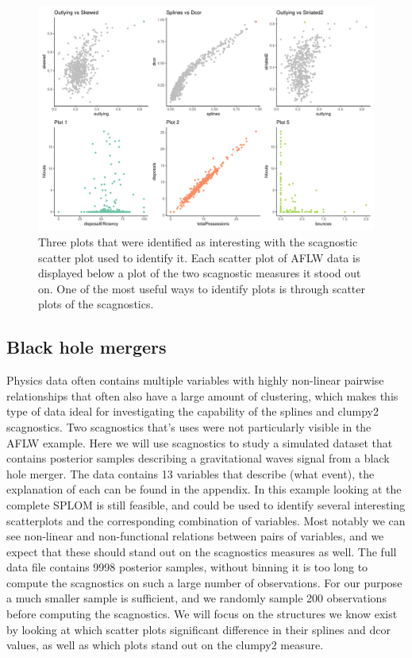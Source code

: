 \begin{Schunk}
\begin{figure}

{\centering \includegraphics[width=0.8\linewidth]{mason-lee-laa-cook_files/figure-latex/threeplot-static-1} 

}

\caption[Three plots that were identified as interesting with the scagnostic scatter plot used to identify it]{Three plots that were identified as interesting with the scagnostic scatter plot used to identify it. Each scatter plot of AFLW data is displayed below a plot of the two scagnostic measures it stood out on. One of the most useful ways to identify plots is through scatter plots of the scagnostics.}\label{fig:threeplot-static}
\end{figure}
\end{Schunk}

\hypertarget{black-hole-mergers}{%
\subsection{Black hole mergers}\label{black-hole-mergers}}

Physics data often contains multiple variables with highly non-linear
pairwise relationships that often also have a large amount of
clustering, which makes this type of data ideal for investigating the
capability of the splines and clumpy2 scagnostics. Two scagnostics
that's uses were not particularly visible in the AFLW example. Here we
will use scagnostics to study a simulated dataset that contains
posterior samples describing a gravitational waves signal from a black
hole merger. The data contains 13 variables that describe (what event),
the explanation of each can be found in the appendix. In this example
looking at the complete SPLOM is still feasible, and could be used to
identify several interesting scatterplots and the corresponding
combination of variables. Most notably we can see non-linear and
non-functional relations between pairs of variables, and we expect that
these should stand out on the scagnostics measures as well. The full
data file contains 9998 posterior samples, without binning it is too
long to compute the scagnostics on such a large number of observations.
For our purpose a much smaller sample is sufficient, and we randomly
sample 200 observations before computing the scagnostics. We will focus
on the structures we know exist by looking at which scatter plots
significant difference in their splines and dcor values, as well as
which plots stand out on the clumpy2 measure.

